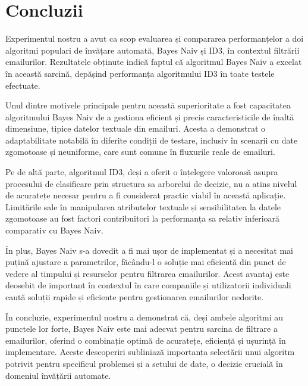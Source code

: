 \documentclass{article}
\begin{document}
\newpage
\section{Concluzii}
Experimentul nostru a avut ca scop evaluarea și compararea performanțelor a doi algoritmi populari de învățare automată, Bayes Naiv și ID3, în contextul filtrării emailurilor. Rezultatele obținute indică faptul că algoritmul Bayes Naiv a excelat în această sarcină, depășind performanța algoritmului ID3 în toate testele efectuate.

Unul dintre motivele principale pentru această superioritate a fost capacitatea algoritmului Bayes Naiv de a gestiona eficient și precis caracteristicile de înaltă dimensiune, tipice datelor textuale din emailuri. Acesta a demonstrat o adaptabilitate notabilă în diferite condiții de testare, inclusiv în scenarii cu date zgomotoase și neuniforme, care sunt comune în fluxurile reale de emailuri.

Pe de altă parte, algoritmul ID3, deși a oferit o înțelegere valoroasă asupra procesului de clasificare prin structura sa arborelui de decizie, nu a atins nivelul de acuratețe necesar pentru a fi considerat practic viabil în această aplicație. Limitările sale în manipularea atributelor textuale și sensibilitatea la datele zgomotoase au fost factori contribuitori la performanța sa relativ inferioară comparativ cu Bayes Naiv.

În plus, Bayes Naiv s-a dovedit a fi mai ușor de implementat și a necesitat mai puțină ajustare a parametrilor, făcându-l o soluție mai eficientă din punct de vedere al timpului și resurselor pentru filtrarea emailurilor. Acest avantaj este deosebit de important în contextul în care companiile și utilizatorii individuali caută soluții rapide și eficiente pentru gestionarea emailurilor nedorite.

În concluzie, experimentul nostru a demonstrat că, deși ambele algoritmi au punctele lor forte, Bayes Naiv este mai adecvat pentru sarcina de filtrare a emailurilor, oferind o combinație optimă de acuratețe, eficiență și ușurință în implementare. Aceste descoperiri subliniază importanța selectării unui algoritm potrivit pentru specificul problemei și a setului de date, o decizie crucială în domeniul învățării automate.

    
% 
% 
\end{document}
